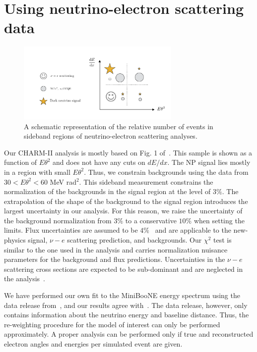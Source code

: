 \section{Using neutrino-electron scattering data}

\begin{figure}
 \includegraphics[width = 0.7\textwidth]{MiniBooNE_tests.pdf}
 \caption{A schematic representation of the relative number of events in sideband regions of neutrino-electron scattering analyses.}
\end{figure}


Our CHARM-II analysis is mostly based on Fig. 1 of~\cite{Vilain:1994qy}. This sample is shown as a function of $E\theta^2$ and does not have any cuts on $dE/dx$. The NP signal lies mostly in a region with small $E\theta^2$. Thus, we constrain backgrounds using the data from $30 < E\theta^2 < 60$ MeV rad$^2$. This sideband measurement constrains the normalization of the backgrounds in the signal region at the level of $3\%$.
The extrapolation of the shape of the background to the signal region introduces the largest uncertainty in our analysis. For this reason, we raise the uncertainty of the background normalization from $3\%$ to a conservative $10 \%$ when setting the limits. Flux uncertainties are assumed to be $4\%$~\cite{Allaby:1987bb} and are applicable to the new-physics signal, $\nu-e$ scattering prediction, and backgrounds. 
Our $\chi^2$ test is similar to the one used in the \minerva analysis and carries normalization nuisance parameters for the background and flux predictions. Uncertainties in the $\nu-e$ scattering cross sections are expected to be sub-dominant and are neglected in the analysis~\cite{deGouvea:2006hfo}.

We have performed our own fit to the MiniBooNE energy spectrum using the data release from~\cite{Aguilar-Arevalo:2018gpe}, and our results agree with~\cite{Bertuzzo:2018itn}. The data release, however, only contains information about the neutrino energy and baseline distance. Thus, the re-weighting procedure for the model of interest can only be performed approximately. A proper analysis can be performed only if true and reconstructed electron angles and energies per simulated event are given.  

